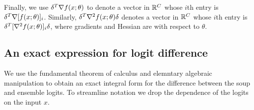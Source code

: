 Finally, we use $\delta^T \nabla f(x;\theta)$ to denote a vector in $\mathbb{R}^C$ whose $i$th entry is $\delta^T \nabla [f(x;\theta)]_i$. Similarly, 
 $\delta^T \nabla^{2} f(x;\theta) \delta$  denotes a vector in $\mathbb{R}^C$ whose $i$th entry is $\delta^T [\nabla^{2} f(x;\theta)]_i \delta$, where gradients and Hessian are with respect to $\theta$. 




\subsection{An exact expression for logit difference}
We use the fundamental theorem of calculus and elemntary algebraic manipulation to obtain an exact integral form for the difference between the soup and ensemble logits. To streamline notation we drop the dependence of the logits on the input $x$.

